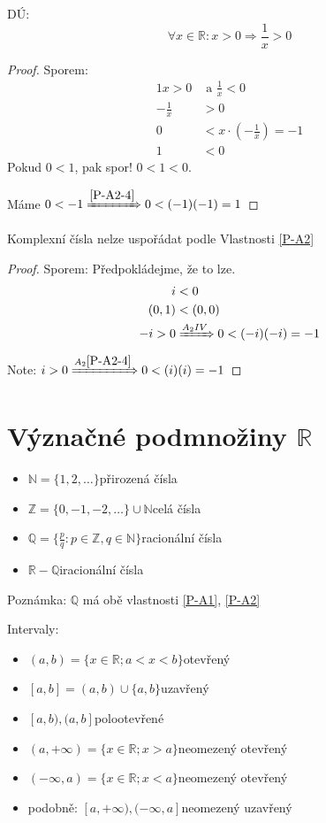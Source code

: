 DÚ:
\begin{equation}
	\forall x \in \mathbb{R}: x>0 \Rightarrow \frac{1}{x}>0
\end{equation}
\begin{proof}
	Sporem:
	\begin{alignat*}{1}
		x>0 &\text{ a } \frac{1}{x}<0 \\
		-\frac{1}{x}&>0 \\
		0&<x\cdot\left(-\frac{1}{x}\right) = -1 \\
		1 &< 0
	\end{alignat*}
	Pokud $0<1$, pak spor! $0<1<0$.

	Máme $0<-1 \xRightarrow{\ref{P-A2-4}} 0<(-1)(-1) = 1$
\end{proof}

\begin{example}
	Komplexní čísla nelze uspořádat podle Vlastnosti \ref{P-A2}
\end{example}
\begin{proof}
	Sporem: Předpokládejme, že to lze.
	\begin{alignat*}{1}
		i&<0 \\
		(0,1)&<(0,0) \\
		-i>0 &\xRightarrow{A_2IV} 0<(-i)(-i) = -1
	\end{alignat*}
	Note: $i>0 \xRightarrow{A_2\ref{P-A2-4}} 0<(i)(i) = -1$
\end{proof}

\section{Význačné podmnožiny \texorpdfstring{$\mathbb{R}$}{R}}
\begin{itemize}
	\item $\mathbb{N} = \{1,2,\dots\}$\quad přirozená čísla
	\item $\mathbb{Z} = \{0,-1,-2,\dots\}\cup\mathbb{N}$\quad celá čísla
	\item $\mathbb{Q} = \{\frac{p}{q}: p\in\mathbb{Z}, q\in\mathbb{N}\}$\quad racionální čísla
	\item $\mathbb{R} - \mathbb{Q}$\quad iracionální čísla
\end{itemize}

Poznámka: $\mathbb{Q}$ má obě vlastnosti \ref{P-A1}, \ref{P-A2}

Intervaly:
\begin{itemize}
	\item $(a,b) = \{x\in\mathbb{R}; a<x<b\}$\quad otevřený
	\item $[a,b] = (a,b)\cup\{a,b\}$\quad uzavřený
	\item $[a,b), (a,b]$\quad polootevřené
	\item $(a,+\infty) = \{x\in\mathbb{R}; x>a\}$\quad neomezený otevřený
	\item $(-\infty, a) = \{x\in\mathbb{R}; x<a\}$\quad neomezený otevřený
	\item podobně: $[a, +\infty), (-\infty, a]$\quad neomezený uzavřený
\end{itemize}


